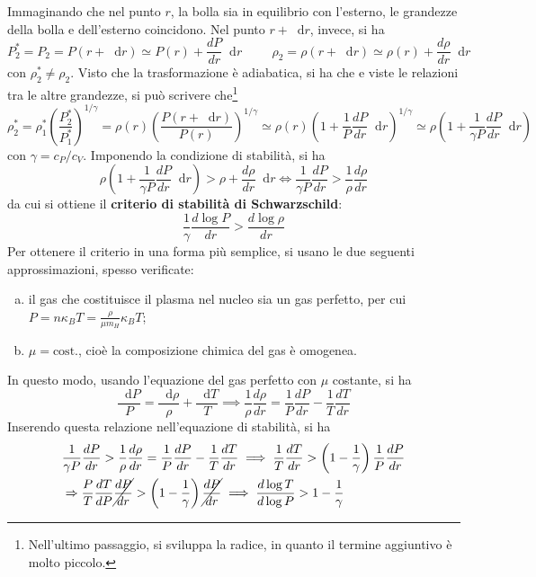 \documentclass[11pt, a4paper]{scrartcl}
\theoremstyle{style}
\theoremstyle{style1}
\newcommand{\dd}{\mathop{}\!\mathrm{d}}
\numberwithin{equation}{subsection}
\begin{document}
Immaginando che nel punto $r$, la bolla sia in equilibrio con l'esterno, le grandezze della bolla e dell'esterno coincidono.
Nel punto $r+\dd r$, invece, si ha
\[
P_2^* = P_2 = P(r+\dd r)\simeq P(r) + \frac{d P}{d r} \dd r \hspace{1cm} \rho _2 = \rho (r+\dd r) \simeq \rho (r) + \frac{d \rho }{d r} \dd r
\] 
con $\rho _2^* \neq \rho _2$.
Visto che la trasformazione \`e adiabatica, si ha che e viste le relazioni tra le altre grandezze, si pu\`o scrivere che\footnote{Nell'ultimo passaggio, si sviluppa la radice, in quanto il termine aggiuntivo \`e molto piccolo.}
\[
\rho _2 ^* = \rho _1^* \left(\frac{P_2^*}{P_1^*}\right) ^{1/\gamma} = \rho (r) \left(\frac{P(r+\dd r)}{P(r)}\right) ^{1 / \gamma} \simeq \rho (r) \left(1 + \frac{1}{P} \frac{d P}{d r} \dd r\right) ^{1 / \gamma} \simeq \rho  \left(1 + \frac{1}{\gamma P} \frac{d P}{d r} \dd r\right) 
\] 
con $\gamma = c_P / c_V$.
Imponendo la condizione di stabilit\`a, si ha 
\[
\rho  \left(1 + \frac{1}{\gamma P } \frac{d P}{d r} \dd r\right) > \rho  + \frac{d \rho }{d r} \dd r \iff  \frac{1}{\gamma P }  \frac{d P}{d r} > \frac{1}{\rho } \frac{d \rho }{d r} 
\] 
da cui si ottiene il \textbf{criterio di stabilit\`a di Schwarzschild}:
\begin{equation}
	\frac{1}{\gamma} \frac{d \log P}{d r} > \frac{d \log \rho }{d r} 
\end{equation}
Per ottenere il criterio in una forma pi\`u semplice, si usano le due seguenti approssimazioni, spesso verificate:
\begin{enumerate}[(a).]
	\item il gas che costituisce il plasma nel nucleo sia un gas perfetto, per cui $P = n \kappa _B T = \frac{\rho}{\mu m_H}\kappa _B T$;
	\item $\mu = \text{cost.}$, cio\`e la composizione chimica del gas \`e omogenea.
\end{enumerate}
In questo modo, usando l'equazione del gas perfetto con $\mu $ costante, si ha
\[
\frac{\dd P}{P} = \frac{\dd \rho }{\rho } + \frac{\dd T}{T} \implies \frac{1}{\rho } \frac{d \rho }{d r}  = \frac{1}{P} \frac{d P}{d r}  - \frac{1}{T} \frac{d T}{d r} 
\] 
Inserendo questa relazione nell'equazione di stabilit\`a, si ha
\[
	\begin{split}
		&\frac{1}{\gamma P } \frac{d P}{d r}  > \frac{1}{\rho } \frac{d \rho }{d r}  = \frac{1}{P} \frac{d P}{d r} - \frac{1}{T} \frac{d T}{d r} \implies \frac{1}{T} \frac{d T}{d r} > \left(1 - \frac{1}{\gamma}\right) \frac{1}{P} \frac{d P}{d r} \\
		&\Rightarrow \frac{P}{T} \frac{d T}{d P} \cancel{\frac{d P}{d r}}  > \left(1 - \frac{1}{\gamma}\right) \cancel{\frac{d P}{d r} }\implies \frac{d \log T}{d \log P}  > 1-\frac{1}{\gamma}
	\end{split}
\] 
\end{document}
